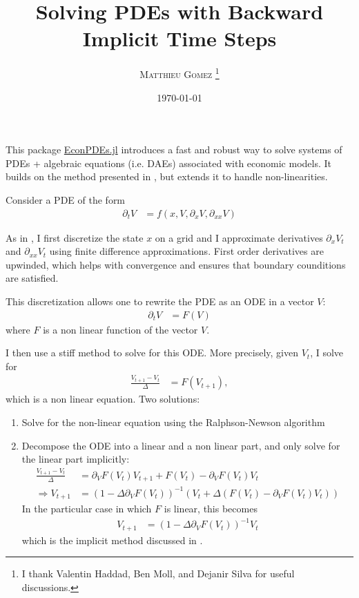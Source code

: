 \documentclass[english]{article}
\begin{document}
	\title{Solving PDEs with Backward Implicit Time Steps}
	\author{\large{\textsc{Matthieu Gomez \thanks{I thank Valentin Haddad, Ben Moll, and Dejanir Silva for useful discussions.}}}}
	\date{\today}
	\maketitle
	This package \href{https://github.com/matthieugomez/EconPDEs.jl}{EconPDEs.jl} introduces a fast and robust way to solve systems of PDEs + algebraic equations (i.e. DAEs) associated with economic models. It builds on the method presented in \citet{achdou2014heterogeneous}, but extends it to handle non-linearities.

	Consider a PDE of the form
	\begin{align}
		\label{pde}
		\partial_t V&=f(x, V, \partial_x V, \partial_{xx} V)
	\end{align}

	As in \citet{achdou2014heterogeneous}, I first discretize the state $x$ on a grid and I approximate derivatives $\partial_x V_t$ and $\partial_{xx} V_t$ using finite difference approximations. First order derivatives are upwinded, which helps with convergence and ensures that boundary counditions are satisfied.

	This discretization allows one to rewrite the PDE as an ODE in a vector $V$:
	\begin{align*}
		\partial_t V&= F(V)
	\end{align*}
	where $F$ is a non linear function of the vector $V$.

	I then use a stiff method to solve for this  ODE. More precisely, given $V_t$, I solve for
	\begin{align}
		\frac{V_{t+1}-V_t}{\Delta}&=F(V_{t+1}),\label{fs1}
	\end{align}
	which is a non linear equation. Two solutions:
	\begin{enumerate}
		\item Solve for the non-linear equation using the Ralphson-Newson algorithm
		\item Decompose the ODE into a linear and a non linear part, and only solve for the linear part implicitly:
		\begin{align*}
			\frac{V_{t+1}-V_t}{\Delta}&= \partial_V F(V_{t}) V_{t+1} + F(V_t) - \partial_V F(V_t) V_t\\
			\Rightarrow V_{t+1} &= (1 - \Delta \partial_V F(V_{t}))^{-1}\left(V_t + \Delta (F(V_t) - \partial_V F(V_t) V_t)\right)
		\end{align*}
		In the particular case in which $F$ is linear, this becomes
			\begin{align*}
				V_{t+1} &= (1 - \Delta \partial_V F(V_{t}))^{-1}V_t
			\end{align*}
			which is the implicit method discussed in \citet{achdou2014heterogeneous}.
	\end{enumerate}
	
\end{document}
